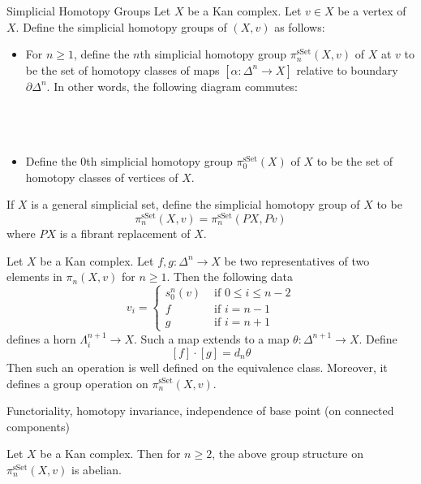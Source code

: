 \documentclass[a4paper]{article}
\begin{document}
\begin{defn}{Simplicial Homotopy Groups}{} Let $X$ be a Kan complex. Let $v\in X$ be a vertex of $X$. Define the simplicial homotopy groups of $(X,v)$ as follows: 
\begin{itemize}
\item For $n\geq 1$, define the $n$th simplicial homotopy group $\pi_n^\text{sSet}(X,v)$ of $X$ at $v$ to be the set of homotopy classes of maps $[\alpha:\Delta^n\to X]$ relative to boundary $\partial\Delta^n$. In other words, the following diagram commutes: \\~\\
\\~\\
\item Define the $0$th simplicial homotopy group $\pi_0^\text{sSet}(X)$ of $X$ to be the set of homotopy classes of vertices of $X$. 
\end{itemize}
If $X$ is a general simplicial set, define the simplicial homotopy group of $X$ to be $$\pi_n^\text{sSet}(X,v)=\pi_n^\text{sSet}(PX,Pv)$$ where $PX$ is a fibrant replacement of $X$. 
\end{defn}

\begin{thm}{}{} Let $X$ be a Kan complex. Let $f,g:\Delta^n\to X$ be two representatives of two elements in $\pi_n(X,v)$ for $n\geq 1$. Then the following data $$v_i=\begin{cases}
s_0^n(v) & \text{ if } 0\leq i\leq n-2\\
f & \text{ if } i=n-1\\
g & \text{ if } i=n+1
\end{cases}$$
defines a horn $\Lambda_i^{n+1}\to X$. Such a map extends to a map $\theta:\Delta^{n+1}\to X$. Define $$[f]\cdot[g]=d_n\theta$$ Then such an operation is well defined on the equivalence class. Moreover, it defines a group operation on $\pi_n^\text{sSet}(X,v)$. 
\end{thm}

Functoriality, homotopy invariance, independence of base point (on connected components)

\begin{prp}{}{} Let $X$ be a Kan complex. Then for $n\geq 2$, the above group structure on $\pi_n^\text{sSet}(X,v)$ is abelian. 
\end{prp}
\end{document}
